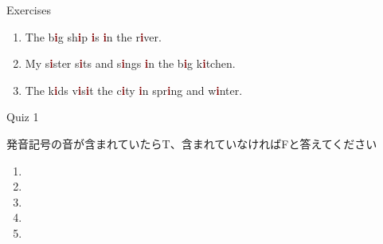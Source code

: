 \documentclass[aspectratio=169,xcolor={dvipsnames,table}]{beamer}
\begin{document}
\begin{frame}[plain]{Exercises }
\LARGE

\begin{enumerate}
 \item The b\textcolor{Maroon}{\bfseries i}g sh\textcolor{Maroon}{\bfseries i}p \textcolor{Maroon}{\bfseries i}s \textcolor{Maroon}{\bfseries i}n the r\textcolor{Maroon}{\bfseries i}ver.
 \item My s\textcolor{Maroon}{\bfseries i}ster s\textcolor{Maroon}{\bfseries i}ts and s\textcolor{Maroon}{\bfseries i}ngs \textcolor{Maroon}{\bfseries i}n the b\textcolor{Maroon}{\bfseries i}g k\textcolor{Maroon}{\bfseries i}tchen.
 \item The k\textcolor{Maroon}{\bfseries i}ds v\textcolor{Maroon}{\bfseries i}s\textcolor{Maroon}{\bfseries i}t the c\textcolor{Maroon}{\bfseries i}ty \textcolor{Maroon}{\bfseries i}n spr\textcolor{Maroon}{\bfseries i}ng and w\textcolor{Maroon}{\bfseries i}nter.

\end{enumerate}
\hfill{\scriptsize {}}

\end{frame}
\begin{frame}[plain]{Quiz 1}

 発音記号の音が含まれていたらT、含まれていなければFと答えてください

\LARGE
\begin{enumerate}
 \item \mbox{}\hspace{40pt}\hspace{150pt}\mbox{}
 \item \mbox{}\hspace{40pt}\hspace{150pt}\mbox{}
 \item \mbox{}\hspace{40pt}\hspace{150pt}\mbox{}
 \item \mbox{}\hspace{40pt}\hspace{150pt}\mbox{}
 \item \mbox{}\hspace{40pt}\hspace{150pt}\mbox{}
\end{enumerate}
\hfill{\scriptsize {}}

\end{frame}
\end{document}
